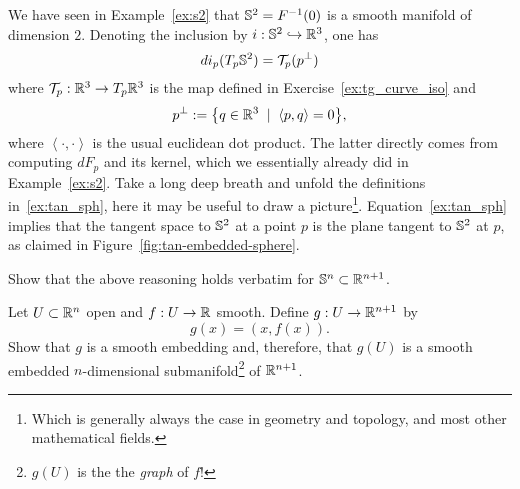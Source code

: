 \begin{example}
  We have seen in Example~\ref{ex:s2} that $\mathbb{S}^2 = F^{-1}(0)$ is a smooth manifold of dimension $2$.
  Denoting the inclusion by $i:\mathbb{S}^2 \hookrightarrow\mathbb{R}^3$, one has
  \begin{equation}\label{ex:tan_sph}
    di_p(T_p\mathbb{S}^2) = \mathcal{T}_p(p^\perp)
  \end{equation}
  where $\mathcal{T}_p:\mathbb{R}^3\to T_p\mathbb{R}^3$ is the map defined in Exercise~\ref{ex:tg_curve_iso} and
  \begin{equation}
    p^\perp := \big\{q\in\mathbb{R}^3 \;\mid\; \left\langle p, q\right\rangle = 0\big\},
  \end{equation}
  where $\left\langle\cdot,\cdot\right\rangle$ is the usual euclidean dot product. The latter directly comes from computing $dF_p$ and its kernel, which we essentially already did in Example~\ref{ex:s2}.
  Take a long deep breath and unfold the definitions in~\eqref{ex:tan_sph}, here it may be useful to draw a picture\footnote{Which is generally always the case in geometry and topology, and most other mathematical fields.}.
  Equation~\eqref{ex:tan_sph} implies that the tangent space to $\mathbb{S}^2$ at a point $p$ is the plane tangent to $\mathbb{S}^2$ at $p$, as claimed in Figure~\ref{fig:tan-embedded-sphere}.
\end{example}

\begin{exercise}
  Show that the above reasoning holds verbatim for $\mathbb{S}^n\subset\mathbb{R}^{n+1}$.
\end{exercise}

\begin{exercise}
  Let $U\subset\mathbb{R}^n$ open and $f:U\to\mathbb{R}$ smooth.
  Define $g:U\to\mathbb{R}^{n+1}$ by
  \begin{equation}
    g(x) = (x, f(x)).
  \end{equation}
  Show that $g$ is a smooth embedding and, therefore, that $g(U)$ is a smooth embedded $n$-dimensional submanifold\footnote{$g(U)$ is the the \emph{graph} of $f$!} of $\mathbb{R}^{n+1}$.
\end{exercise}

